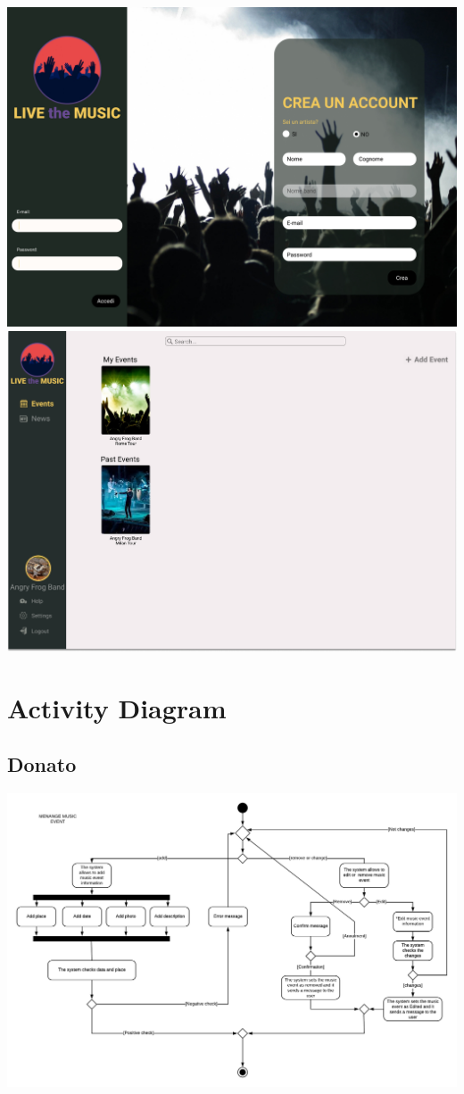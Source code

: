 \documentclass[11pt,a4paper]{article}
\begin{document}
\begin{itemize}
\includegraphics[scale=0.25]{Login.jpg}
\includegraphics[scale=0.25]{AddEvent.jpg}
\section{Activity Diagram}
\subsection{Donato}
\includegraphics[scale=0.5]{ManageMusicEvent.png}

\end{itemize}
\end{document}
